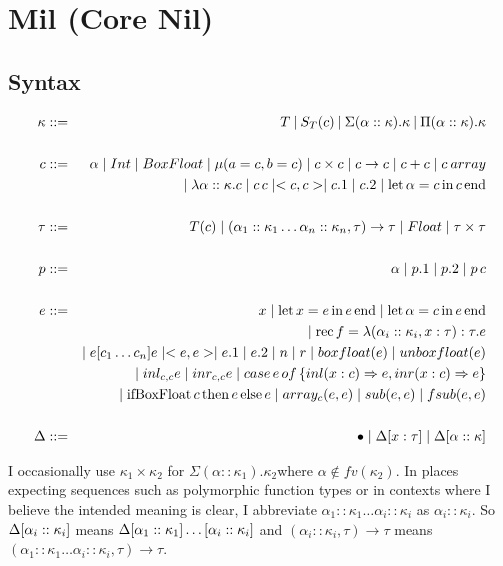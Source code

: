 \documentclass[12pt,twoside,fleqn]{amsart}
\theoremstyle{plain}
\theoremstyle{plain}
\theoremstyle{definition}
\begin{document}
\newcommand{\sigkind}[3]{\Sigma (#1 ::#2 ).#3 }

\newcommand{\kone}{\kappa _{1}}

\newcommand{\ktwo}{\kappa _{2}}



\section{Mil (Core Nil)}


\subsection{Syntax}


\begin{eqnarray*}
\kappa  & ::= & T\: |\: S_{T}(c )\: |\: \Sigma (\alpha ::\kappa ).\kappa \: |\: \Pi (\alpha ::\kappa ).\kappa \\
 &  & \\
c & ::= & \alpha \mid Int\mid BoxFloat\mid \mu (a=c,b=c)\mid c\times c\mid c\rightarrow c\mid c+c\mid c \: array\\
 &  & \mid \lambda \alpha  ::\kappa  .c\mid c\, c\mid <c,c>\mid c.1\mid c.2\mid \mathrm{let}\, \alpha  =c \, \mathrm{in}\, c \, \mathrm{end}\\
 &  & \\
\tau  & ::= & T(c)\mid (\alpha _{1}::\kappa _{1}\ldots \alpha _{n}::\kappa _{n},\tau )\rightarrow \tau \mid Float\mid \tau \times \tau \\
 &  & \\
p & ::= & \alpha \mid p.1\mid p.2\mid p\, c\\
 &  & \\
e & ::= & x\mid \mathrm{let}\, x =e \, \mathrm{in}\, e \, \mathrm{end}\mid \mathrm{let}\, \alpha  =c \, \mathrm{in}\, e \, \mathrm{end}\\
 &  & \mid \mathrm{rec}\, f =\lambda (\alpha _{i} ::\kappa _{i} ,x :\tau  ):\tau  .e\\
 &  & \mid e[c_{1}\ldots c_{n}]e\mid <e,e>\mid e.1\mid e.2\mid n\mid r\mid boxfloat(e )\mid unboxfloat(e )\\
 &  & \mid inl_{c ,c }e\mid inr_{c ,c }e\mid case\, e \, of\, \{inl(x :c )\Rightarrow e ,inr(x :c )\Rightarrow e \}\\
 &  & \mid \mathrm{ifBoxFloat}\, c \, \mathrm{then}\, e \, \mathrm{else}\, e\mid array_{c }(e ,e )\mid sub(e ,e )\mid fsub(e ,e )\\
 &  & \\
\Delta  & ::= & \bullet \mid \Delta  [x  :\tau   ]\mid \Delta  [\alpha   ::\kappa   ]
\end{eqnarray*}


I occasionally use \( \kappa _{1}\times \kappa _{2} \) for \( \Sigma (\alpha ::\kappa _{1}).\kappa _{2} \)where
\( \alpha \notin fv(\kappa _{2}) \). In places expecting sequences such as
polymorphic function types or in contexts where I believe the intended meaning
is clear, I abbreviate \( \alpha _{1}::\kappa _{1}\ldots \alpha _{i}::\kappa _{i} \)
as \( \alpha _{i}::\kappa _{i} \). So \( \Delta  [\alpha _{i}  ::\kappa _{i}  ] \)
means \( \Delta  [\alpha _{1}  ::\kappa _{1}  ]\ldots [\alpha _{i} ::\kappa _{i} ] \)
and \( (\alpha _{i}::\kappa _{i},\tau )\rightarrow \tau  \) means \( (\alpha _{1}::\kappa _{1}\ldots \alpha _{i}::\kappa _{i},\tau )\rightarrow \tau  \).
\end{document}
